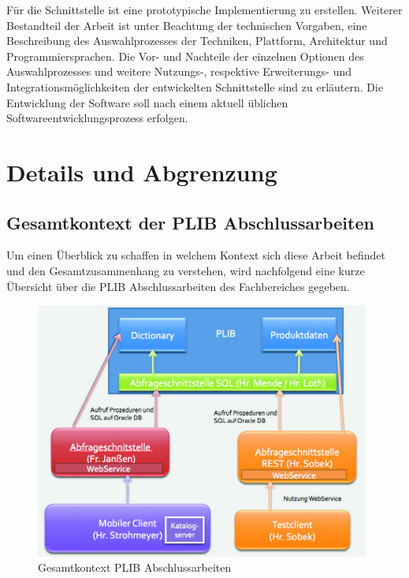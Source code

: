 Für die Schnittstelle ist eine prototypische Implementierung zu erstellen. Weiterer Bestandteil der Arbeit ist unter Beachtung der technischen Vorgaben, eine Beschreibung des Auswahlprozesses der Techniken, Plattform, Architektur und Programmiersprachen. Die Vor- und Nachteile der einzelnen Optionen des Auswahlprozesses und weitere Nutzungs-, respektive Erweiterungs- und Integrationsmöglichkeiten der entwickelten Schnittstelle sind zu erläutern. 
Die Entwicklung der Software soll nach einem aktuell üblichen Softwareentwicklungsprozess erfolgen. 

\section{Details und Abgrenzung}

\subsection{Gesamtkontext der PLIB Abschlussarbeiten}

Um einen Überblick zu schaffen in welchem Kontext sich diese Arbeit befindet und den Gesamtzusammenhang zu verstehen, wird nachfolgend eine kurze Übersicht über die PLIB Abschlussarbeiten des Fachbereiches gegeben.


\begin{figure}[htbp]
	\centering
		\includegraphics[width=0.98\textwidth]{images/gesamtkontext_plib.jpg}
	\caption{Gesamtkontext PLIB Abschlussarbeiten}
	\label{fig:gesamtkontext_plib}
\end{figure}

